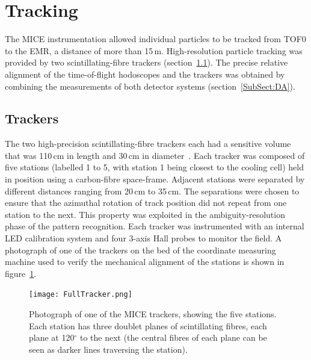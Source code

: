 

\section{Tracking}
\label{Sect:Tracking}

The MICE instrumentation allowed individual particles to be tracked from TOF0 to
the EMR, a distance of more than 15\,m.
High-resolution particle tracking was provided by two
scintillating-fibre trackers (section~\ref{SubSect:Tracker}).
The precise relative alignment of the time-of-flight hodoscopes and
the trackers was obtained by combining the measurements of both
detector systems (section~\ref{SubSect:DA}). 

\graphicspath{{06-Tracking/Figures/}}

\subsection{Trackers}
\label{SubSect:Tracker}

The two high-precision scintillating-fibre trackers each had a
sensitive volume that was 110\,cm in length and 30\,cm in
diameter~\cite{Ellis:2010bb}.
Each tracker was composed of five stations (labelled 1 to 5, with
station 1 being closest to the cooling cell) held in position using a
carbon-fibre space-frame.  
Adjacent stations were separated by different distances ranging from
20\,cm to 35\,cm.
The separations were chosen to ensure that the azimuthal rotation of
track position did not repeat from one station to the next.
This property was exploited in the ambiguity-resolution phase of the
pattern recognition.
Each tracker was instrumented with an internal LED calibration system
and four 3-axis Hall probes to monitor the field.
A photograph of one of the trackers on the bed of the coordinate
measuring machine used to verify the mechanical alignment of the
stations is shown in figure~\ref{Figure:FullTracker}.
\begin{figure}
  \begin{center}
    \texttt{[image: FullTracker.png]}
  \end{center}
  \caption{
    Photograph of one of the MICE trackers, showing the five stations.
    Each station has three doublet planes of scintillating fibres, each plane
    at 120$^\circ$ to the next (the central fibres of each plane can
    be seen as darker lines traversing the station).
  }
  \label{Figure:FullTracker}
\end{figure}

